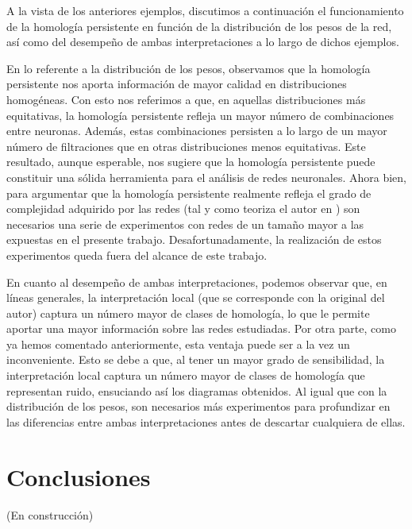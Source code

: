 \documentclass[12pt, a4paper, twoside]{book}
\numberwithin{equation}{section}
\theoremstyle{definition}
\theoremstyle{remark}
\theoremstyle{plain}
\begin{document}
	A la vista de los anteriores ejemplos, discutimos a continuación el 
	funcionamiento de la homología persistente en función de la 
	distribución de los pesos de la red, así como del desempeño de ambas 
	interpretaciones a lo largo de dichos ejemplos.

	En lo referente a la distribución de los pesos, observamos que la 
	homología persistente nos aporta información de mayor calidad en 
	distribuciones homogéneas. Con esto nos referimos a que, en aquellas 
	distribuciones más equitativas, la homología persistente refleja un 
	mayor número de combinaciones entre neuronas. Además, estas 
	combinaciones persisten a lo largo de un mayor número de filtraciones 
	que en otras distribuciones menos equitativas. Este resultado, aunque
	esperable, nos sugiere que la homología persistente puede constituir 
	una sólida herramienta para el análisis de redes neuronales. Ahora 
	bien, para argumentar que la homología persistente realmente refleja 
	el grado de complejidad adquirido por las redes (tal y como teoriza el 
	autor en \cite{Articulo-Watanabe}) son necesarios una serie de 
	experimentos con redes de un tamaño mayor a las expuestas en el 
	presente trabajo. Desafortunadamente, la realización de estos 
	experimentos queda fuera del alcance de este trabajo.

	En cuanto al desempeño de ambas interpretaciones, podemos observar 
	que, en líneas generales, la interpretación local (que se corresponde 
	con la original del autor) captura un número mayor de clases de 
	homología, lo que le permite aportar una mayor información sobre las 
	redes estudiadas. Por otra parte, como ya hemos comentado 
	anteriormente, esta ventaja puede ser a la vez un inconveniente. Esto 
	se debe a que, al tener un mayor grado de sensibilidad, la 
	interpretación local captura un número mayor de clases de homología 
	que representan ruido, ensuciando así los diagramas obtenidos. Al 
	igual que con la distribución de los pesos, son necesarios más 
	experimentos para profundizar en las diferencias entre ambas 
	interpretaciones antes de descartar cualquiera de ellas.

	\chapter{Conclusiones}
	(En construcción)
	\nocite{*}
	
	
\end{document}
